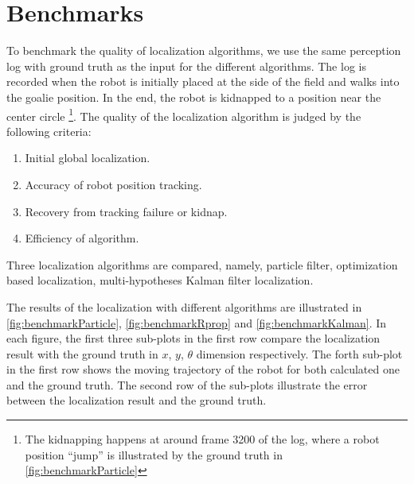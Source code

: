 




\section{Benchmarks}
\label{sec:Benchmark}
To benchmark the quality of localization algorithms, we use the same perception log with ground truth as the input for the different algorithms. The log is recorded when the robot is initially placed at the side of the field and walks into the goalie position. In the end, the robot is kidnapped to a position near the center circle \footnote{The kidnapping happens at around frame 3200 of the log, where a robot position ``jump'' is illustrated by the ground truth in \autoref{fig:benchmarkParticle}}. The quality of the localization algorithm is judged by the following criteria: 
\begin{enumerate}
  \item Initial global localization.
  \item Accuracy of robot position tracking.
  \item Recovery from tracking failure or kidnap.
  \item Efficiency of algorithm.
\end{enumerate}

Three localization algorithms are compared, namely, particle filter, optimization based localization, multi-hypotheses Kalman filter localization.

The results of the localization with different algorithms are illustrated in 
\autoref{fig:benchmarkParticle}, \autoref{fig:benchmarkRprop} and \autoref{fig:benchmarkKalman}. In each figure, the first three sub-plots in the first row compare the localization result with the ground truth in $x$, $y$, $\theta$ dimension respectively. The forth sub-plot in the first row shows the moving trajectory of the robot for both calculated one and the ground truth. The second row of the sub-plots illustrate the error between the localization result and the ground truth.

